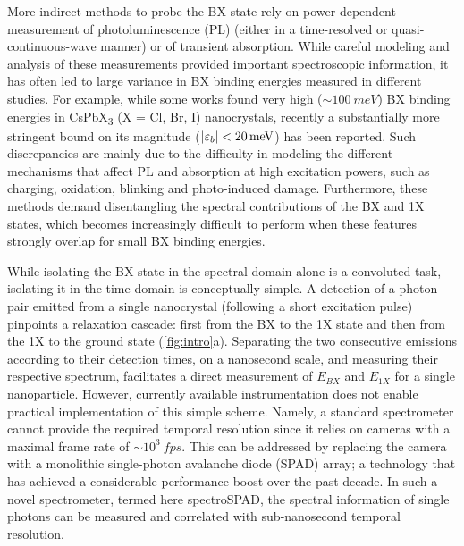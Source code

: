 \documentclass[journal=nalefd, manuscript=letter, layout=twocolumn]{achemso}
\begin{document}
More indirect methods to probe the BX state rely on power-dependent measurement of photoluminescence (PL) (either in a time-resolved or quasi-continuous-wave manner)\cite{Oron2006, Sitt2009, You2015, Shulenberger2019} or of transient absorption\cite{Castaneda2016, Steinhoff2018}. While careful modeling and analysis of these measurements provided important spectroscopic information, it has often led to large variance in BX binding energies measured in different studies. For example, while some works found very high (${\sim}\SI{100}{meV}$) BX binding energies in CsPbX\textsubscript{3} (X = Cl, Br, I) nanocrystals\cite{Castaneda2016}, recently a substantially more stringent bound on its magnitude ($\abs{\varepsilon_b}<\SI{20}{meV}$) has been reported\cite{Shulenberger2019,Ashner2019}.
Such discrepancies are mainly due to the difficulty in modeling the different mechanisms that affect PL and absorption at high excitation powers, such as charging, oxidation, blinking and photo-induced damage\cite{Shulenberger2019}. Furthermore, these methods demand disentangling the spectral contributions of the BX and 1X states, which becomes increasingly difficult to perform when these features strongly overlap for small BX binding energies.

While isolating the BX state in the spectral domain alone is a convoluted task, isolating it in the time domain is conceptually simple. A detection of a photon pair emitted from a single nanocrystal (following a short excitation pulse) pinpoints a relaxation cascade\cite{Stevenson2006, Akopian2006}: first from the BX to the 1X state and then from the 1X to the ground state (\autoref{fig:intro}a). Separating the two consecutive emissions according to their detection times, on a nanosecond scale, and measuring their respective spectrum, facilitates a direct measurement of $E_{BX}$ and $E_{1X}$ for a single nanoparticle.
However, currently available instrumentation does not enable practical implementation of this simple scheme. Namely, a standard spectrometer cannot provide the required temporal resolution since it relies on cameras with a maximal frame rate of ${\sim}10^3~\si{fps}$. This can be addressed by replacing the camera with a monolithic single-photon avalanche diode (SPAD) array; a technology that has achieved a considerable performance boost over the past decade\cite{Bruschini2019, Morimoto2020}. In such a novel spectrometer, termed here spectroSPAD, the spectral information of single photons can be measured and correlated with sub-nanosecond temporal resolution.
\end{document}
